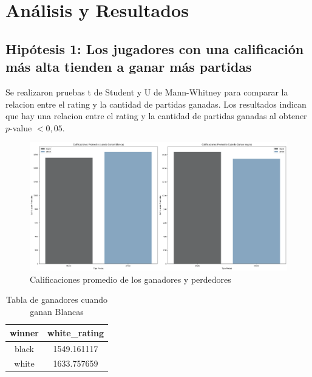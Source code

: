 \documentclass[a4paper, 12pt]{article}
\begin{document}
\newpage

\section{Análisis y Resultados}
\subsection{Hipótesis 1: Los jugadores con una calificación más alta tienden a ganar más partidas}
Se realizaron pruebas t de Student y U de Mann-Whitney para comparar la relacion entre el rating y la cantidad de partidas ganadas. 
Los resultados indican que hay una relacion entre el rating y la cantidad de partidas ganadas al obtener $p$-value $< 0{,}05$.

\begin{figure}[H]
    \centering
    \includegraphics[width=\textwidth]{../Imagenes/Hipotesis_1.png}
    \caption{Calificaciones promedio de los ganadores y perdedores}
    \label{fig:ratings_winners_losers}
\end{figure}


\begin{table}[h!]
    \centering
    \begin{tabular}{|c|c|}
        \hline
        \textbf{winner} & \textbf{white\_rating} \\ \hline
        black & 1549.161117 \\ \hline
        white & 1633.757659 \\ \hline
    \end{tabular}
    \caption{Tabla de ganadores cuando ganan Blancas}
    \label{table:white_rating}
\end{table}

\end{document}
